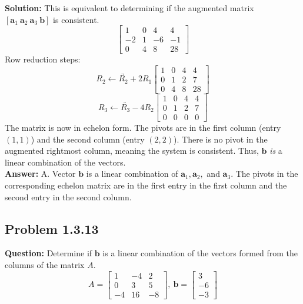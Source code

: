 \documentclass[11pt]{article}
\begin{document}
\textbf{Solution:}
This is equivalent to determining if the augmented matrix $[\mathbf{a}_1 \ \mathbf{a}_2 \ \mathbf{a}_3 \ \mathbf{b}]$ is consistent.
\[ \begin{bmatrix} 1 & 0 & 4 & 4 \\ -2 & 1 & -6 & -1 \\ 0 & 4 & 8 & 28 \end{bmatrix} \]
Row reduction steps:
\[ \underrightarrow{R_2 \leftarrow R_2 + 2R_1} \begin{bmatrix} 1 & 0 & 4 & 4 \\ 0 & 1 & 2 & 7 \\ 0 & 4 & 8 & 28 \end{bmatrix} \]
\[ \underrightarrow{R_3 \leftarrow R_3 - 4R_2} \begin{bmatrix} 1 & 0 & 4 & 4 \\ 0 & 1 & 2 & 7 \\ 0 & 0 & 0 & 0 \end{bmatrix} \]
The matrix is now in echelon form. The pivots are in the first column (entry $(1,1)$) and the second column (entry $(2,2)$). There is no pivot in the augmented rightmost column, meaning the system is consistent. Thus, $\mathbf{b}$ \textit{is} a linear combination of the vectors.
\\
\textbf{Answer:} A. Vector $\mathbf{b}$ is a linear combination of $\mathbf{a}_1, \mathbf{a}_2,$ and $\mathbf{a}_3$. The pivots in the corresponding echelon matrix are in the first entry in the first column and the second entry in the second column.


\subsection*{Problem 1.3.13}
\textbf{Question:} Determine if $\mathbf{b}$ is a linear combination of the vectors formed from the columns of the matrix $A$.
\[ A = \begin{bmatrix} 1 & -4 & 2 \\ 0 & 3 & 5 \\ -4 & 16 & -8 \end{bmatrix}, \ \mathbf{b} = \begin{bmatrix} 3 \\ -6 \\ -3 \end{bmatrix} \]
\end{document}
